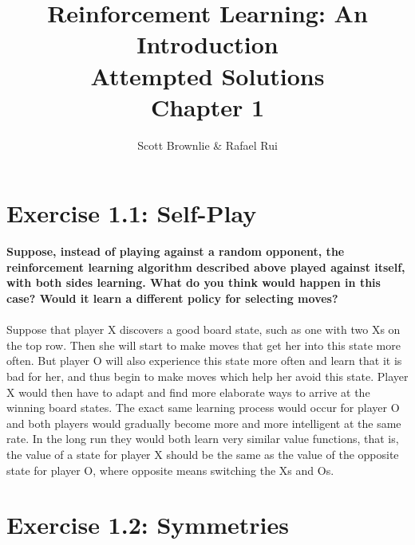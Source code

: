 \documentclass[a4paper,11pt]{article}
\title{Reinforcement Learning: An Introduction \\ Attempted Solutions \\ Chapter 1}
\author{Scott Brownlie \& Rafael Rui}
\date{}
\numberwithin{equation}{section}
\theoremstyle{remark}
\begin{document}
\maketitle

\section{Exercise 1.1: Self-Play}

\textbf{Suppose, instead of playing against a random opponent, the reinforcement learning algorithm described above played against itself, with both sides learning. What do you think would happen in this case? Would it learn a different policy for selecting moves?}
\\ \\
Suppose that player X discovers a good board state, such as one with two Xs on the top row. Then she will start to make moves that get her into this state more often. But player O will also experience this state more often and learn that it is bad for her, and thus begin to make moves which help her avoid this state. Player X would then have to adapt and find more elaborate ways to arrive at the winning board states. The exact same learning process would occur for player O and both players would gradually become more and more intelligent at the same rate. In the long run they would both learn very similar value functions, that is, the value of a state for player X should be the same as the value of the opposite state for player O, where opposite means switching the Xs and Os. 


\section{Exercise 1.2: Symmetries}
\end{document}
